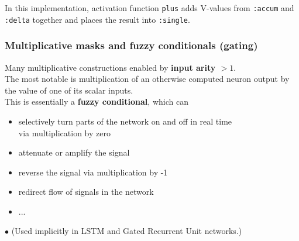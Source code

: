 \documentclass{beamer}
\newcommand{\msmagenta}[1]{{\color{mymagenta} #1}}
\newcommand{\msgreen}[1]{{\color{mygreen} #1}}
\begin{document}
\begin{frame}

In this implementation, activation function \msgreen{\footnotesize \tt plus} adds V-values from 
{\footnotesize\tt :accum} and {\footnotesize\tt :delta}
together and places the result into {\footnotesize\tt :single}.

\end{frame}

\begin{frame}

  \frametitle{Multiplicative masks and fuzzy conditionals (gating)}

Many multiplicative constructions enabled by {\bf input arity $>1$}.\\[2ex]

The most notable is multiplication of an otherwise computed
neuron output by the value of one of its scalar inputs.\\[2ex]

This is essentially a {\bf fuzzy conditional}, which can
\begin{itemize} 
\item selectively
turn parts of the network on and off in real time\\ via multiplication by zero
\item attenuate or amplify the signal
\item  reverse the signal
via multiplication by -1
\item  redirect
flow of signals in the network
\item ... \\[2ex]
\end{itemize}

 \msmagenta{\Large $\bullet$} (Used implicitly in LSTM and Gated Recurrent Unit networks.)

\end{frame}
\end{document}
